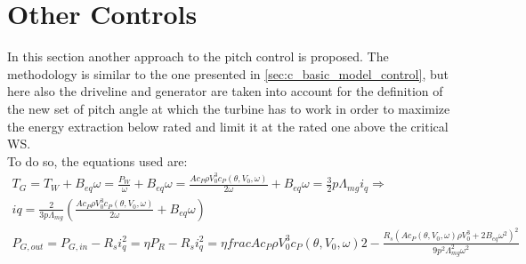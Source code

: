 \section{Other Controls}\label{sec:other_controls}
In this section another approach to the pitch control is proposed. The methodology is similar to the one presented in \autoref{sec:c_basic_model_control}, but here also the driveline and generator are taken into account for the definition of the new set of pitch angle at which the turbine has to work in order to maximize the energy extraction below rated and limit it at the rated one above the critical WS. \\
To do so, the equations used are:
\begin{gather}
  T_G = T_W + B_{eq}\omega = \frac{P_W}{\omega} + B_{eq}\omega = \frac{A c_P \rho V_0^3 c_P(\theta, V_0, \omega)}{2\omega} + B_{eq}\omega = \frac{3}{2}p\Lambda_{mg}i_q \Rightarrow \\
  iq = \frac{2}{3p\Lambda_{mg}}\left(\frac{A c_P \rho V_0^3 c_P(\theta, V_0, \omega)}{2\omega} + B_{eq}\omega\right) \\ 
  P_{G, out} = P_{G, in} - R_s i_q^2 = \eta P_R - R_s i_q^2 = \eta frac{A c_P \rho V_0^3 c_P(\theta, V_0, \omega)}{2} - \frac{R_s \left(A c_P(\theta, V_0, \omega) \rho V_0^3 + 2 B_{eq}\omega^2 \right)^2}{9p^2\Lambda_{mg}^2\omega^2} \label{eq:P_G_out} 
\end{gather}

